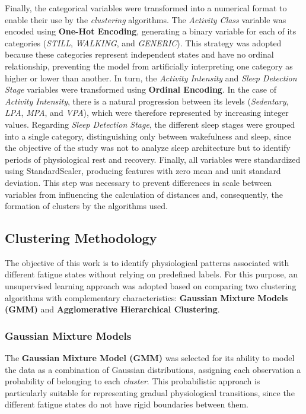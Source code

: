 \documentclass[a4paper,fleqn]{cas-sc}
\begin{document}
Finally, the categorical variables were transformed into a numerical format to enable their use by the \textit{clustering} algorithms. The \textit{Activity Class} variable was encoded using \textbf{One-Hot Encoding}, generating a binary variable for each of its categories (\textit{STILL}, \textit{WALKING}, and \textit{GENERIC}). This strategy was adopted because these categories represent independent states and have no ordinal relationship, preventing the model from artificially interpreting one category as higher or lower than another. In turn, the \textit{Activity Intensity} and \textit{Sleep Detection Stage} variables were transformed using \textbf{Ordinal Encoding}. In the case of \textit{Activity Intensity}, there is a natural progression between its levels (\textit{Sedentary}, \textit{LPA}, \textit{MPA}, and \textit{VPA}), which were therefore represented by increasing integer values. Regarding \textit{Sleep Detection Stage}, the different sleep stages were grouped into a single category, distinguishing only between wakefulness and sleep, since the objective of the study was not to analyze sleep architecture but to identify periods of physiological rest and recovery. Finally, all variables were standardized using StandardScaler, producing features with zero mean and unit standard deviation. This step was necessary to prevent differences in scale between variables from influencing the calculation of distances and, consequently, the formation of clusters by the algorithms used.

\subsection{Clustering Methodology}

The objective of this work is to identify physiological patterns associated with different fatigue states without relying on predefined labels. For this purpose, an unsupervised learning approach was adopted based on comparing two clustering algorithms with complementary characteristics: \textbf{Gaussian Mixture Models (GMM)} and \textbf{Agglomerative Hierarchical Clustering}.

\subsubsection{Gaussian Mixture Models}

The \textbf{Gaussian Mixture Model (GMM)} was selected for its ability to model the data as a combination of Gaussian distributions, assigning each observation a probability of belonging to each \textit{cluster}. This probabilistic approach is particularly suitable for representing gradual physiological transitions, since the different fatigue states do not have rigid boundaries between them.
\end{document}
